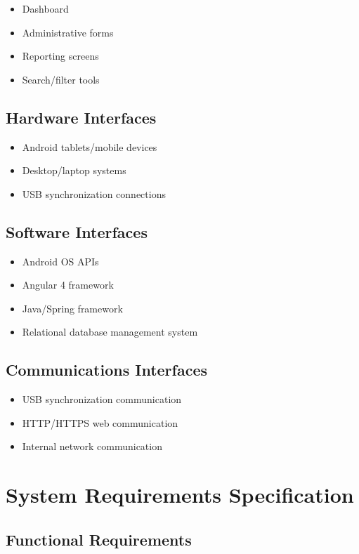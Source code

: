 \documentclass[12pt]{article}
\begin{document}
\begin{itemize}
\item Dashboard
\item Administrative forms
\item Reporting screens
\item Search/filter tools
\end{itemize}

\subsection{Hardware Interfaces}

\begin{itemize}
\item Android tablets/mobile devices
\item Desktop/laptop systems
\item USB synchronization connections
\end{itemize}

\subsection{Software Interfaces}

\begin{itemize}
\item Android OS APIs
\item Angular 4 framework
\item Java/Spring framework
\item Relational database management system
\end{itemize}

\subsection{Communications Interfaces}

\begin{itemize}
\item USB synchronization communication
\item HTTP/HTTPS web communication
\item Internal network communication
\end{itemize}

\section{System Requirements Specification}

\subsection{Functional Requirements}
\end{document}

